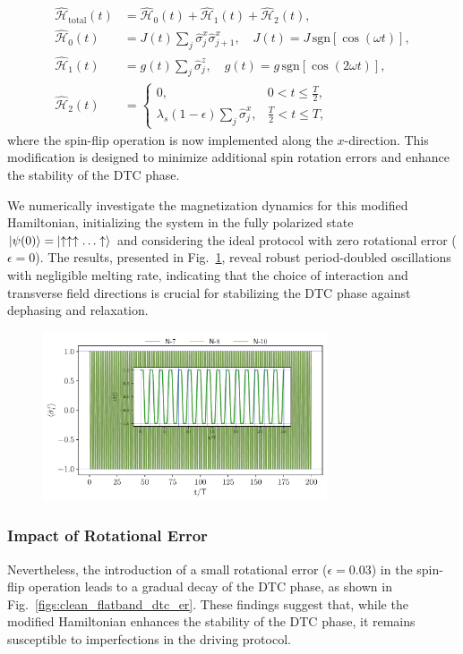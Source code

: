 \documentclass[a4paper, 10pt]{article}
\begin{document}
\begin{align}
    \hat{\mathcal{H}}_{\text{total}}(t) &=  \hat{\mathcal{H}}_0(t) + \hat{\mathcal{H}}_1(t)  + \hat{\mathcal{H}}_2(t), \\
    \hat{\mathcal{H}}_0(t) &= J(t)\sum_{j} \hat{\sigma}_j^x \hat{\sigma}_{j+1}^x, \quad J(t) = J\, \mathrm{sgn}[\cos(\omega t)], \\
    \hat{\mathcal{H}}_1(t) &= g(t)\sum_{j}\hat{\sigma}_j^z, \quad g(t) = g\, \mathrm{sgn}[\cos(2 \omega t)], \\
    \hat{\mathcal{H}}_2(t) &=
    \begin{cases}
        0, & 0 < t \leq \frac{T}{2}, \\
        \lambda_s (1- \epsilon)\sum_{j}\hat{\sigma}_j^x, & \frac{T}{2} < t \leq T,
    \end{cases}
\end{align}
where the spin-flip operation is now implemented along the $x$-direction. This modification is designed to minimize additional spin rotation errors and enhance the stability of the DTC phase.

We numerically investigate the magnetization dynamics for this modified Hamiltonian, initializing the system in the fully polarized state $\ket{\psi(0)} = \ket{\uparrow \uparrow \uparrow \ldots \uparrow}$ and considering the ideal protocol with zero rotational error ($\epsilon = 0$). The results, presented in Fig.~\ref{figs:clean_flatband_dtc}, reveal robust period-doubled oscillations with negligible melting rate, indicating that the choice of interaction and transverse field directions is crucial for stabilizing the DTC phase against dephasing and relaxation.

\begin{figure}[h!]
    \centering
    \includegraphics[height=5cm]{figs/DTC_mag_inset_er=0.0_J=0.18_g=0.09.pdf}
    \caption{}
    \label{figs:clean_flatband_dtc}
\end{figure}

\subsubsection{Impact of Rotational Error}
Nevertheless, the introduction of a small rotational error ($\epsilon = 0.03$) in the spin-flip operation leads to a gradual decay of the DTC phase, as shown in Fig.~\ref{figs:clean_flatband_dtc_er}. These findings suggest that, while the modified Hamiltonian enhances the stability of the DTC phase, it remains susceptible to imperfections in the driving protocol.
\end{document}
